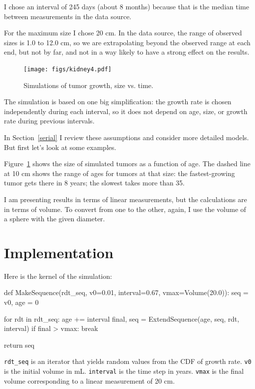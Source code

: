 \documentclass[12pt]{book}
\theoremstyle{exercise}
\begin{document}
I chose an interval of 245 days (about 8 months) because that is the
median time between measurements in the data source.

For the maximum size I chose 20 cm.  In the data source, the range of
observed sizes is 1.0 to 12.0 cm, so we are extrapolating beyond
the observed range at each end, but not by far, and not in a way
likely to have a strong effect on the results.

\begin{figure}
\centerline{\texttt{[image: figs/kidney4.pdf]}}
\caption{Simulations of tumor growth, size vs. time.}
\label{fig.kidney4}
\end{figure}

The simulation is based on one big simplification:
the growth rate is chosen independently during each interval,
so it does not depend on age, size, or growth rate during
previous intervals.

In Section~\ref{serial} I review these assumptions and
consider more detailed models.  But first let's look at some
examples.

Figure~\ref{fig.kidney4} shows 
the size of simulated tumors as a function of
age.  The dashed line at 10 cm shows the range of ages for tumors at
that size: the fastest-growing tumor gets there in 8 years; the
slowest takes more than 35.

I am presenting results in terms of linear measurements, but the
calculations are in terms of volume.  To convert from one to the
other, again, I use the volume of a sphere with the given
diameter.


\section{Implementation}

Here is the kernel of the simulation:

\begin{code}
def MakeSequence(rdt_seq, v0=0.01, interval=0.67, vmax=Volume(20.0)):
    seq = v0,
    age = 0

    for rdt in rdt_seq:
        age += interval
        final, seq = ExtendSequence(age, seq, rdt, interval)
        if final > vmax:
            break

    return seq
\end{code}

\verb"rdt_seq" is an iterator that yields 
random values from the CDF of growth rate.
{\tt v0} is the initial volume in mL.  {\tt interval} is the time step
in years.  {\tt vmax} is the final volume corresponding to a linear
measurement of 20 cm.
\end{document}
